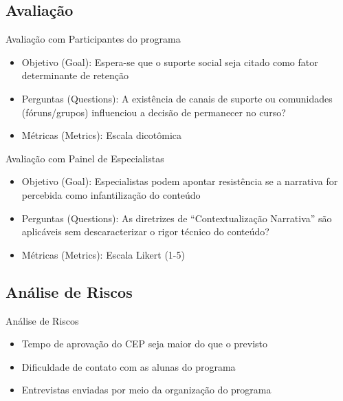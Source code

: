 \documentclass{beamer}
\begin{document}
	\subsection{Avaliação}
		\begin{frame}{Avaliação com Participantes do programa}
			\begin{itemize}
				\justifying
				\item Objetivo (Goal): Espera-se que o suporte social seja citado como fator determinante de retenção
				\item Perguntas (Questions): A existência de canais de suporte ou comunidades (fóruns/grupos) influenciou a decisão de permanecer no curso?
				\item Métricas (Metrics): Escala dicotômica
			\end{itemize}
		\end{frame}
		\begin{frame}{Avaliação com Painel de Especialistas}
			\begin{itemize}
				\justifying
				\item Objetivo (Goal): Especialistas podem apontar resistência se a narrativa for percebida como infantilização do conteúdo
				\item Perguntas (Questions): As diretrizes de \enquote{Contextualização Narrativa} são aplicáveis sem descaracterizar o rigor técnico do conteúdo?
				\item Métricas (Metrics): Escala Likert (1-5)
			\end{itemize}
		\end{frame}
	\subsection{Análise de Riscos}
		\begin{frame}{Análise de Riscos}
			\begin{itemize}
				\justifying
				\item Tempo de aprovação do CEP seja maior do que o previsto
				\item Dificuldade  de contato com as alunas do programa
				\item Entrevistas enviadas por meio da organização do programa
			\end{itemize}
		\end{frame}
\end{document}
